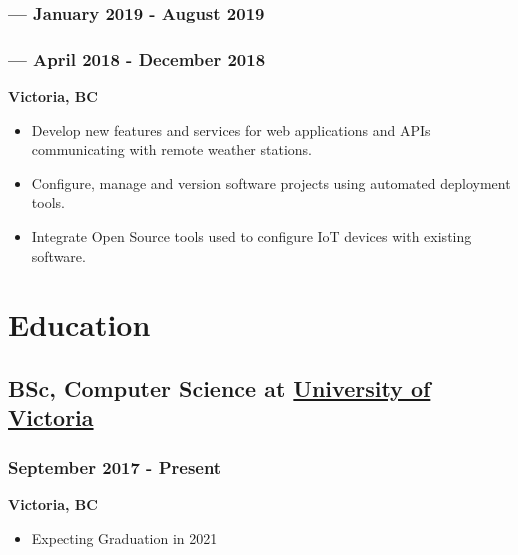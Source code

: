 \documentclass[letterpaper]{article}
\begin{document}
\subsubsection{ --- January 2019 - August 2019}
\label{sec:orgfcd1f2f}
\vspace{2.4ex}
\subsubsection{ --- April 2018 - December 2018}
\label{sec:orge4eddeb}
\vspace{-1ex}
\textbf{Victoria, BC}
\begin{itemize}
\item Develop new features and services for web applications and APIs communicating with remote weather stations.
\item Configure, manage and version software projects using automated deployment tools.
\item Integrate Open Source tools used to configure IoT devices with existing software.
\end{itemize}
\section{Education}
\label{sec:orgaaa87a4}
\subsection{BSc, Computer Science at \href{https://uvic.ca}{University of Victoria}}
\label{sec:org4c498d2}
\subsubsection{September 2017 - Present}
\label{sec:org28d091f}
\textbf{Victoria, BC}
\begin{itemize}
\item Expecting Graduation in 2021
\end{itemize}
\end{document}
